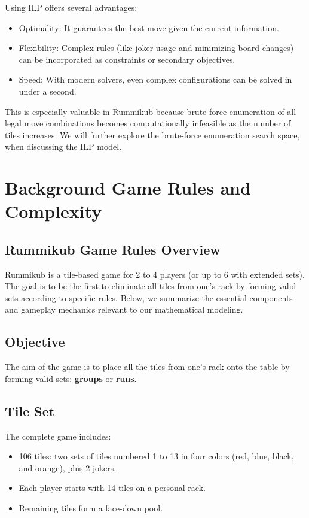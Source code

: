 \documentclass[11pt,letterpaper]{article}
\begin{document}
Using ILP offers several advantages:
\begin{itemize}
    \item Optimality: It guarantees the best move given the current information.

    \item Flexibility: Complex rules (like joker usage and minimizing board changes) can be incorporated as constraints or secondary objectives.

    \item Speed: With modern solvers, even complex configurations can be solved in under a second.

\end{itemize}
This is especially valuable in Rummikub because brute-force enumeration of all legal move 
combinations becomes computationally infeasible as the number of tiles increases. We will further
explore the brute-force enumeration search space, when discussing the ILP model.

\section*{Background Game Rules and Complexity}
\subsection*{Rummikub Game Rules Overview}
Rummikub is a tile-based game for 2 to 4 players (or up to 6 with extended sets). The goal is to be the first to eliminate all tiles from one's rack by forming valid sets according to specific rules. Below, we summarize the essential components and gameplay mechanics relevant to our mathematical modeling.

\subsection*{Objective}
The aim of the game is to place all the tiles from one's rack onto the table by forming valid sets: \textbf{groups} or \textbf{runs}.

\subsection*{Tile Set}
The complete game includes:
\begin{itemize}
    \item 106 tiles: two sets of tiles numbered 1 to 13 in four colors (red, blue, black, and orange), plus 2 jokers.
    \item Each player starts with 14 tiles on a personal rack.
    \item Remaining tiles form a face-down pool.
\end{itemize}
\end{document}

